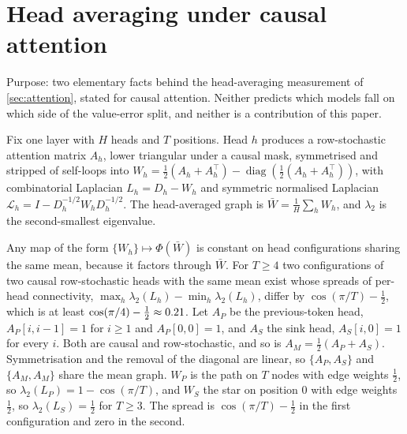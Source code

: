 \clearpage
{}
\makeatletter
\renewcommand*\l@section{\@dottedtocline{1}{0em}{2.0em}}
\renewcommand*\l@subsection{\@dottedtocline{2}{2.0em}{2.8em}}
\makeatother
\renewcommand{\contentsname}{Appendix contents}
{\small\setlength{\parskip}{0pt}\tableofcontents}
\medskip

\section{Head averaging under causal attention}
\label{app:proofs}

Purpose: two elementary facts behind the head-averaging measurement of \cref{sec:attention}, stated for causal attention. Neither predicts which models fall on which side of the value-error split, and neither is a contribution of this paper.

Fix one layer with $H$ heads and $T$ positions. Head $h$ produces a row-stochastic attention matrix $A_h$, lower triangular under a causal mask, symmetrised and stripped of self-loops into $W_h = \tfrac12(A_h + A_h^\top) - \operatorname{diag}(\tfrac12(A_h + A_h^\top))$, with combinatorial Laplacian $L_h = D_h - W_h$ and symmetric normalised Laplacian $\mathcal{L}_h = I - D_h^{-1/2} W_h D_h^{-1/2}$. The head-averaged graph is $\bar W = \frac1H \sum_h W_h$, and $\lambda_2$ is the second-smallest eigenvalue.

\begin{remark}
\label{prop:annihilation}
Any map of the form $\{W_h\} \mapsto \Phi(\bar W)$ is constant on head configurations sharing the same mean, because it factors through $\bar W$. For $T \ge 4$ two configurations of two causal row-stochastic heads with the same mean exist whose spreads of per-head connectivity, $\max_h \lambda_2(L_h) - \min_h \lambda_2(L_h)$, differ by $\cos(\pi/T) - \tfrac12$, which is at least $\cos(\pi/4) - \tfrac12 \approx 0.21{}$. Let $A_P$ be the previous-token head, $A_P[i,i-1] = 1$ for $i \ge 1$ and $A_P[0,0] = 1$, and $A_S$ the sink head, $A_S[i,0] = 1$ for every $i$. Both are causal and row-stochastic, and so is $A_M = \tfrac12(A_P + A_S)$. Symmetrisation and the removal of the diagonal are linear, so $\{A_P, A_S\}$ and $\{A_M, A_M\}$ share the mean graph. $W_P$ is the path on $T$ nodes with edge weights $\tfrac12$, so $\lambda_2(L_P) = 1 - \cos(\pi/T)$, and $W_S$ the star on position $0$ with edge weights $\tfrac12$, so $\lambda_2(L_S) = \tfrac12$ for $T \ge 3$. The spread is $\cos(\pi/T) - \tfrac12$ in the first configuration and zero in the second.
\end{remark}

